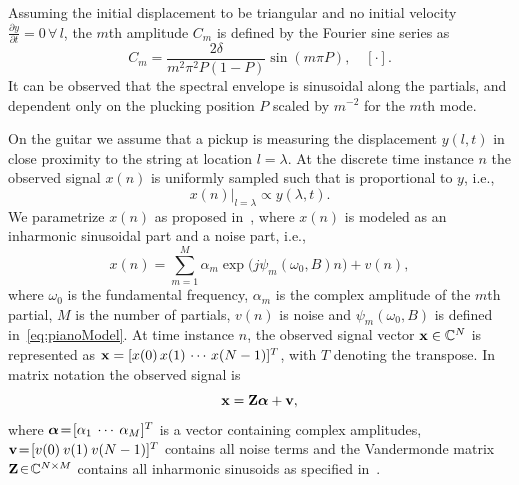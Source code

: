 Assuming the initial displacement to be triangular and no initial velocity $\frac{\partial y}{\partial t} = 0 \, \forall\, l$, the $m$th amplitude $C_m$ is defined by the Fourier sine series as~\cite{donkin:acoustics,fletcher:principles_of_vibration_and_sound}
\begin{equation}
    C_m = \frac{2\delta}{m^2\pi^2P(1-P)}\sin(m\pi P), \quad [\cdot].
\end{equation}
It can be observed that the spectral envelope is sinusoidal along the partials, and dependent only on the plucking position $P$ scaled by $m^{-2}$ for the $m$th mode.

On the guitar we assume that a pickup is measuring the displacement $y(l,t)$ in close proximity to the string at location $l\!=\!\lambda$. At the discrete time instance $n$ the observed signal $x(n)$ is uniformly sampled such that is proportional to $y$, i.e.,
\begin{equation}
     x(n)  \vert_{l=\lambda} \propto y(\lambda, t).
\end{equation}   
We parametrize $x(n)$ as proposed in~\cite{hjerrild::icassp19}, where $x(n)$ is modeled as an inharmonic sinusoidal part and a noise part, i.e.,  
\begin{equation}\label{eq:sigmod1}
  x(n)\! =  \!\sum\limits_{m=1}^{M}\!\! \alpha_{m} \exp\big({j\psi_m(\omega_0,B) n}\big)+v(n),
\end{equation}
where $\omega_0$ is the fundamental frequency, $\alpha_{m}$ is the complex amplitude of the $m$th partial, $M$ is the number of partials, $v(n)$ is noise and $\psi_m(\omega_0,B)$ is defined in~\eqref{eq:pianoModel}.
%
 At time instance $n$, the observed signal vector $\mathbf x \in \mathbb{C}^N$ is represented as $\mathbf x = [x(0) \, x(1) \, \cdots \, x(N-1)]^T$, with $T$ denoting the transpose. %
In matrix notation the observed signal is%
\begin{equation}\label{eq:xZa}
  \mathbf x = \mathbf{Z} \text{\boldmath$\alpha$} + \mathbf v,
\end{equation} 
where $\text{\boldmath$\alpha$}\!=\! [\alpha_1 \: \cdots \: \alpha_M]^T$ is a vector containing complex amplitudes, $\mathbf v\! =\! [v(0) \: v(1) \: v(N-1)]^T$ contains all noise terms and the Vandermonde matrix $\mathbf{Z}\! \in\! \mathbb{C}^{N\times M}$ contains all inharmonic sinusoids as specified in~\cite{hjerrild::icassp19}.
